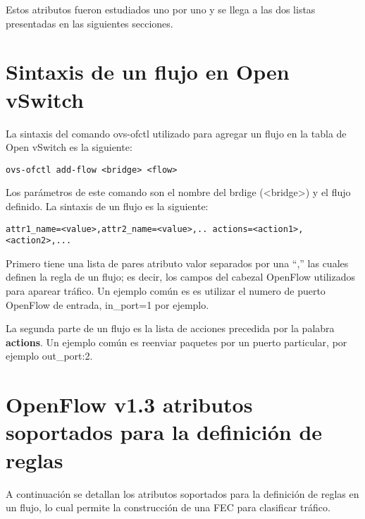 Estos atributos fueron estudiados uno por uno y se llega a las dos listas presentadas en las siguientes secciones.\\

\section{Sintaxis de un flujo en Open vSwitch}
La sintaxis del comando ovs-ofctl utilizado para agregar un flujo en la tabla de Open vSwitch es la siguiente:


\begin{center}
\texttt{ovs-ofctl add-flow <bridge> <flow>}
\end{center}

Los parámetros de este comando son el nombre del brdige (<bridge>) y el flujo definido. La sintaxis de un flujo es la siguiente:

\begin{center}
\texttt{attr1\_name=<value>,attr2\_name=<value>,.. actions=<action1>,<action2>,...}
\end{center}

Primero tiene una lista de pares atributo valor separados por una “,” las cuales definen la regla de un flujo; es decir, los campos del cabezal OpenFlow utilizados para aparear tr\'afico. Un ejemplo común es es utilizar el numero de puerto OpenFlow de entrada, in\_port=1 por ejemplo.

La segunda parte de un flujo es la lista de acciones precedida por la palabra \textbf{actions}. Un ejemplo común es reenviar paquetes por un puerto particular, por ejemplo out\_port:2. 
 
\section{OpenFlow v1.3 atributos soportados para la definici\'on de reglas}

A continuaci\'on se detallan los atributos soportados para la definici\'on de reglas en un flujo, lo cual permite la construcci\'on de una FEC para clasificar tr\'afico.

